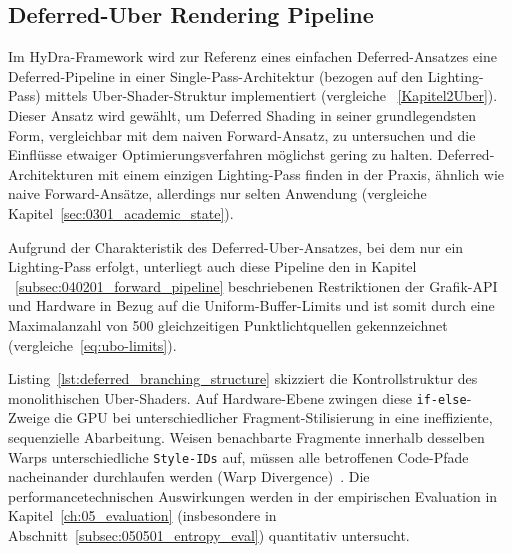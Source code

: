 \subsection{Deferred-Uber Rendering Pipeline}
\label{subsec:040201_deferred_uber_pipeline}

Im \ac{HyDra}-Framework wird zur Referenz eines einfachen Deferred-Ansatzes eine Deferred-Pipeline in einer
Single-Pass-Architektur (bezogen auf den Lighting-Pass) mittels Uber-Shader-Struktur implementiert
(vergleiche ~\ref{Kapitel2Uber}).
Dieser Ansatz wird gewählt, um Deferred Shading in seiner grundlegendsten Form, vergleichbar mit dem naiven
Forward-Ansatz, zu untersuchen und die Einflüsse etwaiger Optimierungsverfahren möglichst gering zu halten.
Deferred-Architekturen mit einem einzigen Lighting-Pass finden in der Praxis, ähnlich
wie naive Forward-Ansätze, allerdings nur selten Anwendung (vergleiche Kapitel~\ref{sec:0301_academic_state}).

Aufgrund der Charakteristik des Deferred-Uber-Ansatzes, bei dem nur ein Lighting-Pass erfolgt, unterliegt auch diese
Pipeline den in Kapitel ~\ref{subsec:040201_forward_pipeline} beschriebenen Restriktionen der Grafik-\ac{API} und
Hardware in Bezug auf die Uniform-Buffer-Limits und ist somit durch eine Maximalanzahl von 500 gleichzeitigen
Punktlichtquellen gekennzeichnet (vergleiche~\ref{eq:ubo-limits}).

Listing~\ref{lst:deferred_branching_structure} skizziert die Kontrollstruktur des monolithischen Uber-Shaders.
Auf Hardware-Ebene zwingen diese \texttt{if-else}-Zweige die \ac{GPU} bei unterschiedlicher Fragment-Stilisierung in
eine ineffiziente, sequenzielle Abarbeitung.
Weisen benachbarte Fragmente innerhalb desselben Warps unterschiedliche \texttt{Style-IDs} auf, müssen alle betroffenen
Code-Pfade nacheinander durchlaufen werden (Warp Divergence)~\cite[S.~32]{akenine-mollerRealtimeRendering2019}.
Die performancetechnischen Auswirkungen werden in der empirischen Evaluation in Kapitel~\ref{ch:05_evaluation}
(insbesondere in Abschnitt~\ref{subsec:050501_entropy_eval}) quantitativ untersucht.

